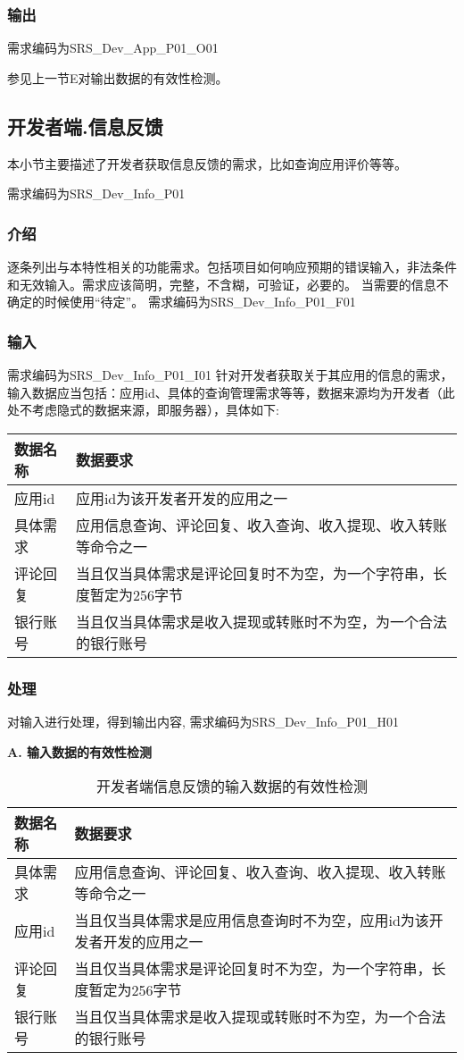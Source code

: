 \subsubsection{输出}
需求编码为SRS\_Dev\_App\_P01\_O01

参见上一节E对输出数据的有效性检测。

\subsection{开发者端.信息反馈}
本小节主要描述了开发者获取信息反馈的需求，比如查询应用评价等等。

需求编码为SRS\_Dev\_Info\_P01

\subsubsection{介绍}
逐条列出与本特性相关的功能需求。包括项目如何响应预期的错误输入，非法条件和无效输入。需求应该简明，完整，不含糊，可验证，必要的。 当需要的信息不确定的时候使用“待定”。
需求编码为SRS\_Dev\_Info\_P01\_F01

\subsubsection{输入}

需求编码为SRS\_Dev\_Info\_P01\_I01
针对开发者获取关于其应用的信息的需求，输入数据应当包括：应用id、具体的查询管理需求等等，数据来源均为开发者（此处不考虑隐式的数据来源，即服务器），具体如下:

\begin{longtable}[]{@{}ll@{}}
\toprule
数据名称 & 数据要求\tabularnewline
\midrule
\endhead
应用id & 应用id为该开发者开发的应用之一\tabularnewline
具体需求 & 应用信息查询、评论回复、收入查询、收入提现、收入转账等命令之一\tabularnewline
评论回复 & 当且仅当具体需求是评论回复时不为空，为一个字符串，长度暂定为256字节\tabularnewline
银行账号 & 当且仅当具体需求是收入提现或转账时不为空，为一个合法的银行账号\tabularnewline
\bottomrule
\end{longtable}

\subsubsection{处理}
对输入进行处理，得到输出内容,
需求编码为SRS\_Dev\_Info\_P01\_H01

\textbf{A. 输入数据的有效性检测}

\begin{longtable}[]{@{}ll@{}}
\caption{开发者端信息反馈的输入数据的有效性检测}\label{tab:developer_app_info}\\
\toprule
数据名称 & 数据要求\tabularnewline
\midrule
\endhead
具体需求 & 应用信息查询、评论回复、收入查询、收入提现、收入转账等命令之一\tabularnewline
应用id & 当且仅当具体需求是应用信息查询时不为空，应用id为该开发者开发的应用之一\tabularnewline
评论回复 & 当且仅当具体需求是评论回复时不为空，为一个字符串，长度暂定为256字节\tabularnewline
银行账号 & 当且仅当具体需求是收入提现或转账时不为空，为一个合法的银行账号\tabularnewline
\bottomrule
\end{longtable}


